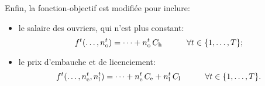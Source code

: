 Enfin, la fonction-objectif est modifiée pour inclure:

\begin{itemize}
    \item le salaire des ouvriers, qui n'est plus constant:
    \[
        f^t(\dots,n_\mathrm{o}^t)
        = \dots + n_\mathrm{o}^t\,C_\mathrm{h}
        \qquad\quad \forall t \in \{1,\dots,T\}
        \text;
    \]
    
    \item le prix d'embauche et de licenciement:
    \[
        f^t(\dots,n_\mathrm{e}^t,n_\mathrm{l}^t)
        = \dots + n_\mathrm{e}^t\,C_\mathrm{e} + n_\mathrm{l}^t\,C_\mathrm{l}
        \qquad\quad \forall t \in \{1,\dots,T\}
        \text.
    \]
\end{itemize}
